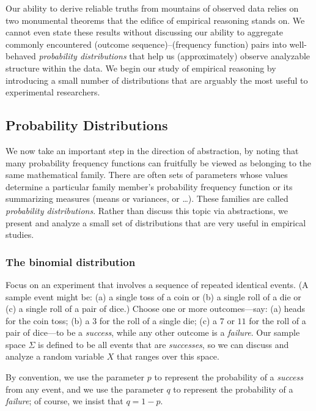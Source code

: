 Our ability to derive reliable truths from mountains of observed data relies on two monumental theorems that the edifice of empirical reasoning stands on.  We cannot even state these results without discussing our ability to aggregate commonly encountered (outcome sequence)--(frequency function) pairs into well-behaved {\it probability distributions} that help us (approximately) observe analyzable structure within the data.  We begin our study of empirical reasoning by introducing a small number of distributions that are arguably the most useful to experimental researchers.

\subsection{Probability Distributions}
\label{sec:prob-distr}

We now take an important step in the direction of abstraction, by noting that many probability frequency functions can fruitfully be viewed as belonging to the same mathematical family.  There are often sets of parameters whose values determine a particular family member's probability frequency function or its summarizing measures (means or variances, or \ldots).  These families are called {\em probability distributions}.  Rather than discuss this topic via abstractions, we present and analyze a small set of distributions that are very useful in empirical studies.

\subsubsection{The binomial distribution}
\label{sec:binomial-distribution}

Focus on an experiment that involves a sequence of repeated identical events.  (A sample event might be: (a) a single toss of a coin or (b) a single roll of a die or (c) a single roll of a pair of dice.)  Choose one or more outcomes---say: (a) {\sc heads} for the coin toss; (b) a $3$ for the roll of a single die; (c) a $7$ or $11$ for the roll of a pair of dice---to be a {\em success}, while any other outcome is a {\em failure}.  Our sample space $\Sigma$ is defined to be all events that are {\em successes}, so we can discuss and analyze a random variable $X$ that ranges over this space.

By convention, we use the parameter $p$ to represent the probability of a {\em success} from any event, and we use the parameter $q$ to represent the probability of a {\em failure}; of course, we insist that $q = 1-p$.

